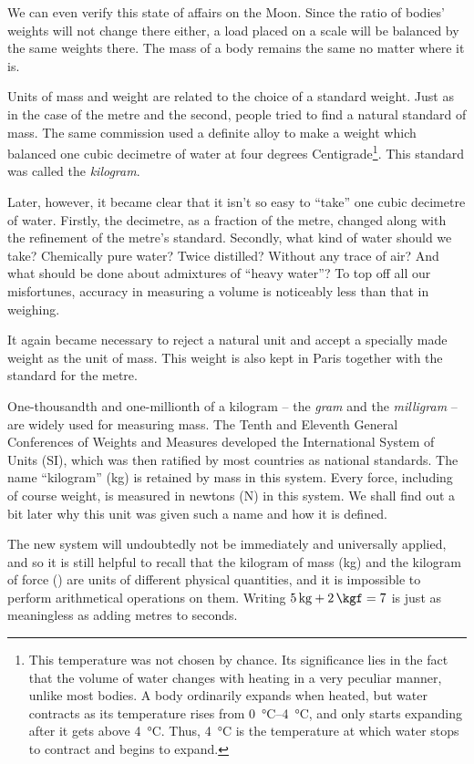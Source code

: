 We can even verify this state of affairs on the Moon. Since the
ratio of bodies' weights will not change there either, a load placed
on a scale will be balanced by the same weights there. The mass of a
body remains the same no matter where it is.


Units of mass and weight are related to the choice of a standard
weight. Just as in the case of the metre and the second, people tried
to find a natural standard of mass. The same commission used a
definite alloy to make a weight which balanced one cubic decimetre of
water at four degrees Centigrade\footnote{This temperature was not
  chosen by chance. Its significance lies in the fact that the volume
  of water changes with heating in a very peculiar manner, unlike most
  bodies. A body ordinarily expands when heated, but water contracts
  as its temperature rises from \SIrange{0}{4}{\degreeCelsius}, and
  only starts expanding after it gets above
  \SI{4}{\degreeCelsius}. Thus, \SI{4}{\degreeCelsius} is the
  temperature at which water stops to contract and begins to
  expand.}. This standard was called the \emph{kilogram}.


Later, however, it became clear that it isn't so easy to ``take'' one
cubic decimetre of water. Firstly, the decimetre, as a fraction of the
metre, changed along with the refinement of the metre's
standard. Secondly, what kind of water should we take? Chemically pure
water? Twice distilled? Without any trace of air? And what should be
done about admixtures of ``heavy water''? To top off all our
misfortunes, accuracy in measuring a volume is noticeably less than
that in weighing.


It again became necessary to reject a natural unit and accept a
specially made weight as the unit of mass. This weight is also kept in
Paris together with the standard for the metre.


One-thousandth and one-millionth of a kilogram -- the \emph{gram} and
the \emph{milligram} -- are widely used for measuring mass. The Tenth
and Eleventh General Conferences of Weights and Measures developed the
International System of Units (SI), which was then ratified by most
countries as national standards. The name ``kilogram'' (\si{\kg}) is
retained by mass in this system. Every force, including of course
weight, is measured in newtons (\si{\newton}) in this system. We shall
find out a bit later why this unit was given such a name and how it is
defined.

The new system will undoubtedly not be immediately and universally
applied, and so it is still helpful to recall that the kilogram of
mass (\si{kg}) and the kilogram of force (\si{\kgf}) are units of different
physical quantities, and it is impossible to perform arithmetical
operations on them.  Writing $\SI{5}{\kg} + \SI{2}{\kgf} = 7$ is just as meaningless as
adding metres to seconds. 

